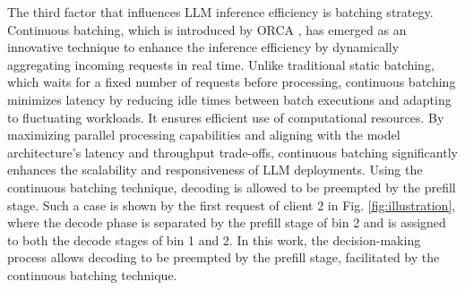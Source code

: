The third factor that influences LLM inference efficiency is batching strategy. Continuous batching, which is introduced by ORCA \cite{yu2022orca}, has emerged as an innovative technique to enhance the inference efficiency by dynamically aggregating incoming requests in real time. Unlike traditional static batching, which waits for a fixed number of requests before processing, continuous batching minimizes latency by reducing idle times between batch executions and adapting to fluctuating workloads. It ensures efficient use of computational resources. By maximizing parallel processing capabilities and aligning with the model architecture's latency and throughput trade-offs, continuous batching significantly enhances the scalability and responsiveness of LLM deployments. Using the continuous batching technique, decoding is allowed to be preempted by the prefill stage. Such a case is shown by the first request of client 2 in Fig. \ref{fig:illustration}, where the decode phase is separated by the prefill stage of bin 2 and is assigned to both the decode stages of bin 1 and 2. In this work, the decision-making process allows decoding to be preempted by the prefill stage, facilitated by the continuous batching technique.


